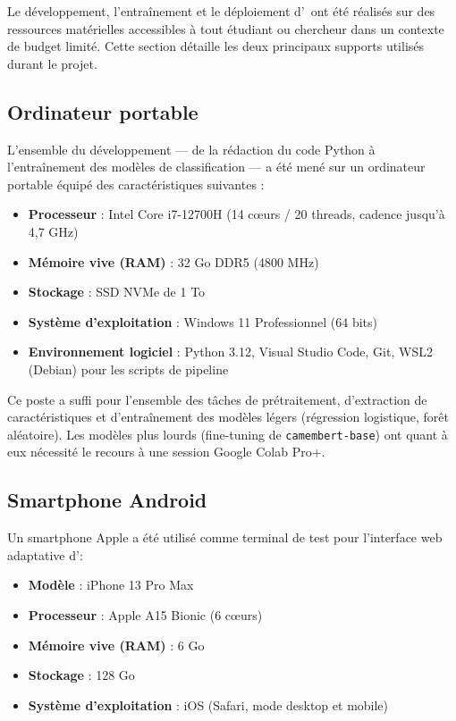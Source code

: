 Le développement, l'entraînement et le déploiement d'\AZIZA\ ont été réalisés sur des ressources matérielles accessibles à tout étudiant ou chercheur dans un contexte de budget limité. Cette section détaille les deux principaux supports utilisés durant le projet.

\subsection{Ordinateur portable}

L'ensemble du développement — de la rédaction du code Python à l'entraînement des modèles de classification — a été mené sur un ordinateur portable équipé des caractéristiques suivantes :

\begin{itemize}
    \item \textbf{Processeur} : Intel Core i7-12700H (14 cœurs / 20 threads, cadence jusqu'à 4,7 GHz)
    \item \textbf{Mémoire vive (RAM)} : 32 Go DDR5 (4800 MHz)
    \item \textbf{Stockage} : SSD NVMe de 1 To
    \item \textbf{Système d'exploitation} : Windows 11 Professionnel (64 bits)
    \item \textbf{Environnement logiciel} : Python 3.12, Visual Studio Code, Git, WSL2 (Debian) pour les scripts de pipeline
\end{itemize}

Ce poste a suffi pour l'ensemble des tâches de prétraitement, d'extraction de caractéristiques et d'entraînement des modèles légers (régression logistique, forêt aléatoire). Les modèles plus lourds (fine-tuning de \texttt{camembert-base}) ont quant à eux nécessité le recours à une session Google Colab Pro+.

\subsection{Smartphone Android}

Un smartphone Apple a été utilisé comme terminal de test pour l'interface web adaptative d'\AZIZA :

\begin{itemize}
    \item \textbf{Modèle} : iPhone 13 Pro Max
    \item \textbf{Processeur} : Apple A15 Bionic (6 cœurs)
    \item \textbf{Mémoire vive (RAM)} : 6 Go
    \item \textbf{Stockage} : 128 Go
    \item \textbf{Système d'exploitation} : iOS (Safari, mode desktop et mobile)
\end{itemize}

